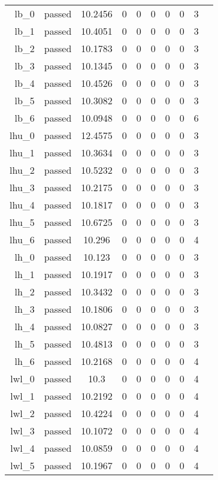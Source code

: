 \begin{longtable}{r|ccccccccc}
    lb\_0 & passed & 10.2456 & 0 & 0 & 0 & 0 & 0 & 3 \\
    lb\_1 & passed & 10.4051 & 0 & 0 & 0 & 0 & 0 & 3 \\
    lb\_2 & passed & 10.1783 & 0 & 0 & 0 & 0 & 0 & 3 \\
    lb\_3 & passed & 10.1345 & 0 & 0 & 0 & 0 & 0 & 3 \\
    lb\_4 & passed & 10.4526 & 0 & 0 & 0 & 0 & 0 & 3 \\
    lb\_5 & passed & 10.3082 & 0 & 0 & 0 & 0 & 0 & 3 \\
    lb\_6 & passed & 10.0948 & 0 & 0 & 0 & 0 & 0 & 6 \\
    lhu\_0 & passed & 12.4575 & 0 & 0 & 0 & 0 & 0 & 3 \\
    lhu\_1 & passed & 10.3634 & 0 & 0 & 0 & 0 & 0 & 3 \\
    lhu\_2 & passed & 10.5232 & 0 & 0 & 0 & 0 & 0 & 3 \\
    lhu\_3 & passed & 10.2175 & 0 & 0 & 0 & 0 & 0 & 3 \\
    lhu\_4 & passed & 10.1817 & 0 & 0 & 0 & 0 & 0 & 3 \\
    lhu\_5 & passed & 10.6725 & 0 & 0 & 0 & 0 & 0 & 3 \\
    lhu\_6 & passed & 10.296 & 0 & 0 & 0 & 0 & 0 & 4 \\
    lh\_0 & passed & 10.123 & 0 & 0 & 0 & 0 & 0 & 3 \\
    lh\_1 & passed & 10.1917 & 0 & 0 & 0 & 0 & 0 & 3 \\
    lh\_2 & passed & 10.3432 & 0 & 0 & 0 & 0 & 0 & 3 \\
    lh\_3 & passed & 10.1806 & 0 & 0 & 0 & 0 & 0 & 3 \\
    lh\_4 & passed & 10.0827 & 0 & 0 & 0 & 0 & 0 & 3 \\
    lh\_5 & passed & 10.4813 & 0 & 0 & 0 & 0 & 0 & 3 \\
    lh\_6 & passed & 10.2168 & 0 & 0 & 0 & 0 & 0 & 4 \\
    lwl\_0 & passed & 10.3 & 0 & 0 & 0 & 0 & 0 & 4 \\
    lwl\_1 & passed & 10.2192 & 0 & 0 & 0 & 0 & 0 & 4 \\
    lwl\_2 & passed & 10.4224 & 0 & 0 & 0 & 0 & 0 & 4 \\
    lwl\_3 & passed & 10.1072 & 0 & 0 & 0 & 0 & 0 & 4 \\
    lwl\_4 & passed & 10.0859 & 0 & 0 & 0 & 0 & 0 & 4 \\
    lwl\_5 & passed & 10.1967 & 0 & 0 & 0 & 0 & 0 & 4 \\

\end{longtable}
